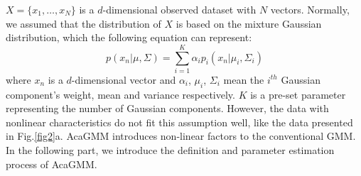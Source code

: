 \documentclass[conference]{IEEEtran}
\begin{document}
$X=\{x_1,\hdots,x_N\}$ is a $d$-dimensional observed dataset with $N$ vectors. Normally, we assumed that the distribution of $X$ is based on the mixture Gaussian distribution, which the following equation can represent:
\begin{equation}
    p(x_n|\mu,\Sigma)=\sum\limits^K_{i=1}\alpha_i p_i(x_n|\mu_i,\Sigma_i)
\end{equation}
where $x_n$ is a $d$-dimensional vector and $\alpha_i$, $\mu_i$, $\Sigma_i$ mean the $i^{th}$ Gaussian component's weight, mean and variance respectively. $K$ is a pre-set parameter representing the number of Gaussian components. However, the data with nonlinear characteristics do not fit this assumption well, like the data presented in Fig.\ref{fig2}a. AcaGMM introduces non-linear factors to the conventional GMM. In the following part, we introduce the definition and parameter estimation process of AcaGMM.
\end{document}
